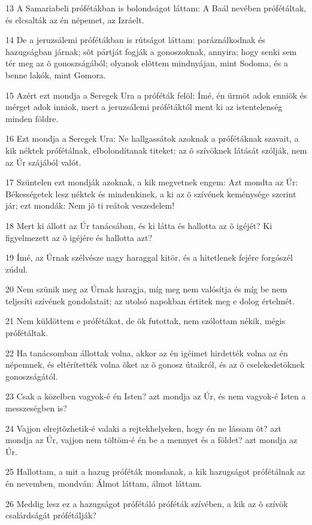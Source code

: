 \par 13 A Samariabeli prófétákban is bolondságot láttam: A Baál nevében prófétáltak, és elcsalták az én népemet, az Izráelt.
\par 14 De a jeruzsálemi prófétákban is rútságot láttam: paráználkodnak és hazugságban járnak; sõt pártját fogják a gonoszoknak, annyira; hogy senki sem tér meg az õ gonoszságából; olyanok elõttem mindnyájan, mint Sodoma, és a benne lakók, mint Gomora.
\par 15 Azért ezt mondja a Seregek Ura a próféták felõl: Ímé, én ürmöt adok enniök és mérget adok inniok, mert a jeruzsálemi prófétáktól ment ki az istentelenség minden földre.
\par 16 Ezt mondja a Seregek Ura: Ne hallgassátok azoknak a prófétáknak szavait, a kik néktek prófétálnak, elbolondítanak titeket: az õ szívöknek látását szólják, nem az Úr szájából valót.
\par 17 Szüntelen ezt mondják azoknak, a kik megvetnek engem: Azt mondta az Úr: Békességetek lesz néktek és mindenkinek, a ki az õ szívének keménysége szerint jár; ezt mondák: Nem jõ ti reátok veszedelem!
\par 18 Mert ki állott az Úr tanácsában, és ki látta és hallotta az õ igéjét? Ki figyelmezett az õ igéjére és hallotta azt?
\par 19 Ímé, az Úrnak szélvésze nagy haraggal kitör, és a hitetlenek fejére forgószél zúdul.
\par 20 Nem szünik meg az Úrnak haragja, míg meg nem valósítja és míg be nem teljesíti szívének gondolatait; az utolsó napokban értitek meg e dolog értelmét.
\par 21 Nem küldöttem e prófétákat, de õk futottak, nem szólottam nékik, mégis prófétáltak.
\par 22 Ha tanácsomban állottak volna, akkor az én igéimet hirdették volna az én népemnek, és eltérítették volna õket az õ gonosz útaikról, és az õ cselekedetöknek gonoszságától.
\par 23 Csak a közelben vagyok-é én Isten? azt mondja az Úr, és nem vagyok-é Isten a messzeségben is?
\par 24 Vajjon elrejtõzhetik-é valaki a rejtekhelyeken, hogy én ne lássam õt? azt mondja az Úr, vajjon nem töltöm-é én be a mennyet és a földet? azt mondja az Úr.
\par 25 Hallottam, a mit a hazug próféták mondanak, a kik hazugságot prófétálnak az én nevemben, mondván: Álmot láttam, álmot láttam.
\par 26 Meddig lesz ez a hazugságot prófétáló próféták szívében, a kik az õ szívök csalárdságát prófétálják?
